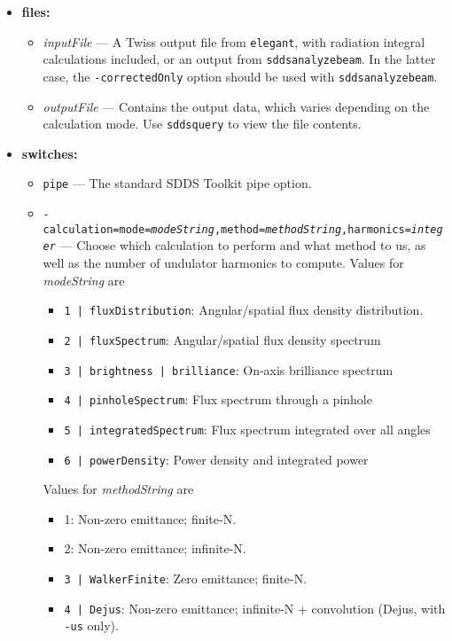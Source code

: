 \documentclass[11pt]{article}
\begin{document}
\begin{itemize}
\item {\bf files:}
\begin{itemize}
\item {\em inputFile} --- A Twiss output file from {\tt elegant}, with radiation integral 
calculations included, or an output from {\tt sddsanalyzebeam}. In the latter case, the
{\tt -correctedOnly} option should be used with {\tt sddsanalyzebeam}.
\item {\em outputFile} --- Contains the output data, which varies depending on the calculation mode.
 Use {\tt sddsquery} to view the file contents.
\end{itemize}

\item {\bf switches:}
\begin{itemize}
\item {\tt pipe} --- The standard SDDS Toolkit pipe option.
\item {\tt -calculation=mode={\em modeString},method={\em methodString},harmonics={\em integer}} ---
 Choose which calculation to perform and what method to us, as well as the number of undulator harmonics to
  compute.  Values for {\em modeString} are
  \begin{itemize}
    \item {\tt 1 | fluxDistribution}:        Angular/spatial flux density distribution.
    \item {\tt 2 | fluxSpectrum}:            Angular/spatial flux density spectrum
    \item {\tt 3 | brightness | brilliance}: On-axis brilliance spectrum
    \item {\tt 4 | pinholeSpectrum}:         Flux spectrum through a pinhole
    \item {\tt 5 | integratedSpectrum}:      Flux spectrum integrated over all angles
    \item {\tt 6 | powerDensity}:            Power density and integrated power
  \end{itemize}
  Values for {\em methodString} are
  \begin{itemize}
    \item 1:                    Non-zero emittance; finite-N.
    \item 2:                    Non-zero emittance; infinite-N.
    \item {\tt 3 | WalkerFinite}:   Zero emittance;     finite-N.
    \item {\tt 4  | Dejus}:           Non-zero emittance; infinite-N + convolution (Dejus, with {\tt -us} only).

\end{itemize}
\end{itemize}
\end{itemize}
\end{document}
